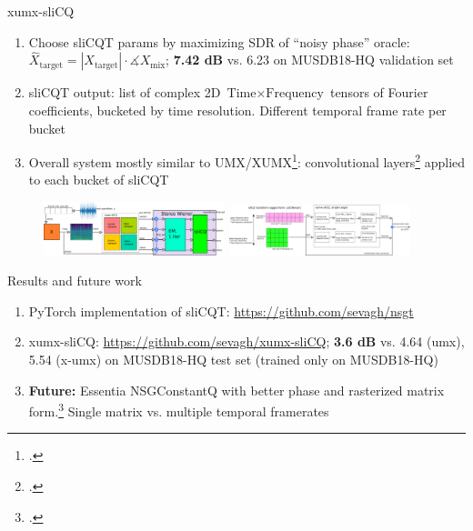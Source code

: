 \documentclass[final]{beamer}
\begin{document}
\begin{frame}{}
\begin{block}{xumx-sliCQ}
\begin{enumerate}
		  \item
			  Choose sliCQT params by maximizing SDR of ``noisy phase'' oracle: $\hat{X}_{\text{target}} = |X_{\text{target}}| \cdot \measuredangle{X_{\text{mix}}}$; \textbf{7.42 dB} vs. 6.23 on MUSDB18-HQ validation set
		  \item
			  sliCQT output: list of complex 2D $\text{Time} \times \text{Frequency}$ tensors of Fourier coefficients, bucketed by time resolution. Different temporal frame rate per bucket
		  \item
			  Overall system mostly similar to UMX/XUMX\footcite{umx, xumx}: convolutional layers\footcite{plumbley2} applied to each bucket of sliCQT
	  \end{enumerate}
    \end{block}
	  \begin{figure}
		  \centering
		  \includegraphics[width=0.47\textwidth]{./images-blockdiagrams/xumx_slicq_system_compressed.png}
		  \hspace{1em}
		  \includegraphics[width=0.47\textwidth]{./images-blockdiagrams/xumx_slicq_pertarget.png}
	  \end{figure}
	\begin{block}{Results and future work}
	  \begin{enumerate}
		  \item
			  PyTorch implementation of sliCQT: \url{https://github.com/sevagh/nsgt}
		  \item
			  xumx-sliCQ: \url{https://github.com/sevagh/xumx-sliCQ}; \textbf{3.6 dB} vs. 4.64 (umx), 5.54 (x-umx) on MUSDB18-HQ test set (trained only on MUSDB18-HQ)
		  \item
			  \textbf{Future:} Essentia NSGConstantQ with better phase and rasterized matrix form.\footcite{variableq1} Single matrix vs. multiple temporal framerates
	  \end{enumerate}
	\end{block}
  \end{frame}
\end{document}
